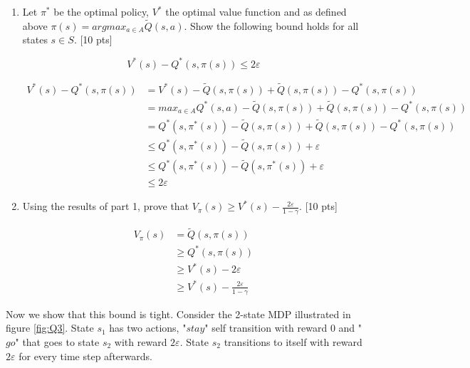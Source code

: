 \documentclass[11pt]{article}
\let\epsilon\varepsilon
\begin{document}
\begin{enumerate}[label=(\alph*)]
\item Let $\pi^*$ be the optimal policy, $V^*$ the optimal value function and as defined above $\pi(s) = argmax_{a\in A} \tilde{Q}(s,a)$. Show the following bound holds for all states $s \in S$. [10 pts]

$$V^*(s) - Q^*(s, \pi(s)) \leq 2 \epsilon$$

\begin{tcolorbox}[breakable]
  \begin{equation}
    \begin{aligned}
      V^*(s)-Q^*(s,\pi(s))&=V^*(s)-\tilde{Q}(s,\pi(s))+\tilde{Q}(s,\pi(s))-Q^*(s,\pi(s))\\
      &=max_{a\in A}Q^*(s,a)-\tilde{Q}(s,\pi(s))+\tilde{Q}(s,\pi(s))-Q^*(s,\pi(s))\\
      &=Q^*(s,\pi^*(s))-\tilde{Q}(s,\pi(s))+\tilde{Q}(s,\pi(s))-Q^*(s,\pi(s))\\
      &\leq Q^*(s,\pi^*(s))-\tilde{Q}(s,\pi(s))+\epsilon\\
      &\leq Q^*(s,\pi^*(s))-\tilde{Q}(s,\pi^*(s))+\epsilon\\
      &\leq 2\epsilon
    \end{aligned}
  \end{equation}
\end{tcolorbox}

\item Using the results of part 1, prove that $V_{\pi}(s) \geq V^*(s) - \frac{2\epsilon}{1-\gamma}$. [10 pts]

\begin{tcolorbox}[breakable]
  \begin{equation}
    \begin{aligned}
      V_\pi(s)&=\tilde{Q}(s,\pi(s))\\
      &\geq Q^*(s,\pi(s))\\
      &\geq V^*(s)-2\epsilon\\
      &\geq V^*(s)-\frac{2\epsilon}{1-\gamma}
    \end{aligned}
  \end{equation}
\end{tcolorbox}

\end{enumerate}

\noindent Now we show that this bound is tight. Consider the 2-state MDP illustrated in figure \ref{fig:Q3}. State $s_1$ has two actions, "$stay$" self transition with reward 0 and "$go$" that goes to state $s_2$ with reward $2\epsilon$. State $s_2$ transitions to itself with reward $2\epsilon$ for every time step afterwards.
\end{document}
